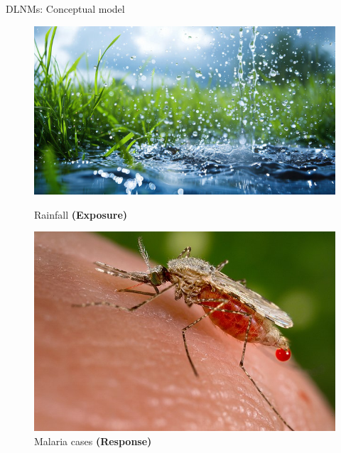 \documentclass[english]{beamer}
\newcommand{\alertblue}[1]{{\color{blue}#1}}
\begin{document}
\begin{frame}{DLNMs: Conceptual model}
\begin{figure}
\end{figure}
\begin{figure}
    \centering
    \begin{minipage}{0.2\linewidth}
        \includegraphics[width=\linewidth]{images/rainfall.jpg}
        \caption{\footnotesize Rainfall \textbf{(Exposure)}}
    \end{minipage}
    \hspace{0.5cm}
    \hspace{0.5cm}
    \begin{minipage}{0.2\linewidth}
        \centering
        \includegraphics[width=\linewidth]{images/malaria.jpeg}
        \caption{\footnotesize Malaria cases \textbf{(Response)}}
    \end{minipage}
\end{figure}
\end{frame}
\end{document}

